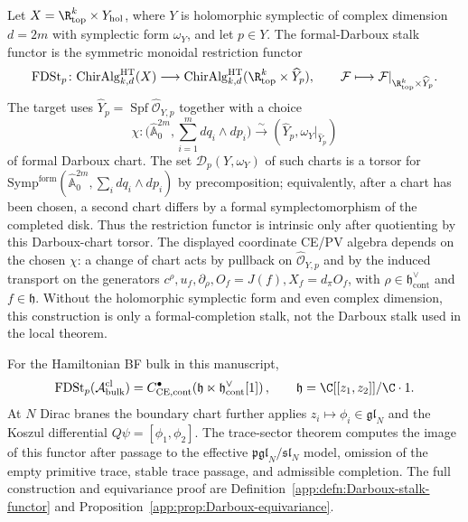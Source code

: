 \begin{defn}\label{defn:formal-darboux-stalk-functor}
  Let
  \(X=\R^k_{\mathrm{top}}\times Y_{\mathrm{hol}}\), where
  \(Y\) is holomorphic symplectic of complex dimension \(d=2m\) with
  symplectic form \(\omega_Y\), and let \(p\in Y\).  The
  formal-Darboux stalk functor is the symmetric monoidal restriction
  functor
  \[
    \operatorname{FDSt}_p\colon
    \mathrm{ChirAlg}^{\mathrm{HT}}_{k,d}(X)
    \longrightarrow
    \mathrm{ChirAlg}^{\mathrm{HT}}_{k,d}
    (\R^k_{\mathrm{top}}\times\widehat{Y}_p),
    \qquad
    \mathcal F\longmapsto
    \mathcal F|_{\R^k_{\mathrm{top}}\times\widehat{Y}_p}.
  \]
  The target uses
  \(\widehat{Y}_p=\operatorname{Spf}\widehat{\mathcal O}_{Y,p}\)
  together with a choice
  \[
    \chi\colon
    \bigl(\widehat{\mathbb A}^{2m}_0,\sum_{i=1}^{m}dq_i\wedge dp_i\bigr)
    \xrightarrow{\;\sim\;}
    (\widehat Y_p,\omega_Y|_{\widehat Y_p})
  \]
  of formal Darboux chart.  The set
  \(\mathscr D_p(Y,\omega_Y)\) of such charts is a torsor for
  \(\mathrm{Symp}^{\mathrm{form}}
  (\widehat{\mathbb A}^{2m}_0,\sum_i dq_i\wedge dp_i)\) by
  precomposition; equivalently, after a chart has been chosen, a second
  chart differs by a formal symplectomorphism of the completed disk.
  Thus the restriction functor is intrinsic only after quotienting by
  this Darboux-chart torsor.  The displayed coordinate CE/PV algebra
  depends on the chosen \(\chi\): a change of chart acts by pullback on
  \(\widehat{\mathcal O}_{Y,p}\) and by the induced transport on the
  generators
  \(c^\rho,u_f,\partial_\rho,O_f=J(f),X_f=d_\pi O_f\), with
  \(\rho\in\mathfrak h^\vee_{\mathrm{cont}}\) and
  \(f\in\mathfrak h\).  Without the holomorphic
  symplectic form and even complex dimension, this construction is only
  a formal-completion stalk, not the Darboux stalk used in the local
  theorem.

  For the Hamiltonian BF bulk in this manuscript,
  \[
    \operatorname{FDSt}_p(\mathcal A^{\mathrm{cl}}_{\mathrm{bulk}})
    =
    C^\bullet_{\mathrm{CE},\mathrm{cont}}\!
    \left(\mathfrak h\ltimes\mathfrak h^\vee_{\mathrm{cont}}[1]\right),
    \qquad
    \mathfrak h=\C[[z_1,z_2]]/\C\cdot1.
  \]
  At \(N\) Dirac branes the boundary chart further applies
  \(z_i\mapsto\phi_i\in\mathfrak{gl}_N\) and the Koszul differential
  \(Q\psi=[\phi_1,\phi_2]\).  The trace-sector theorem computes the
  image of this functor after passage to the effective
  \(\mathfrak{pgl}_N/\mathfrak{sl}_N\) model, omission of the empty
  primitive trace, stable trace passage, and admissible completion.  The
  full construction and equivariance
  proof are Definition~\ref{app:defn:Darboux-stalk-functor} and
  Proposition~\ref{app:prop:Darboux-equivariance}.
\end{defn}

